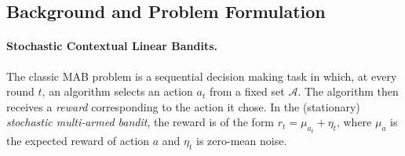\documentclass{article}
\DeclarePairedDelimiter{\paren}()
\newcommand{\A}{\mathcal{A}}
\begin{document}

  
\subsection{Background and Problem Formulation}
\label{subsec:intro_background}

\paragraph{Stochastic Contextual Linear Bandits.}
The classic MAB problem is a sequential decision making task in which, at
every round $t$, an algorithm selects an action $a_t$ from a fixed set $\A$.
The algorithm then receives a \emph{reward}
corresponding to the action it chose.  In the (stationary)
\emph{stochastic multi-armed bandit}, the reward is of the form $r_t =
\mu_{a_t} + \eta_t$, where $\mu_a$ is the expected reward of action $a$
and $\eta_t$ is zero-mean noise. 
\end{document}
